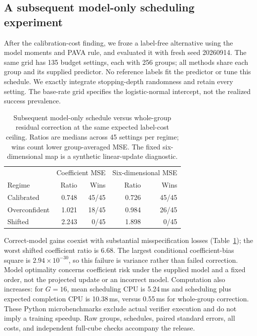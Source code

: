 \subsection{A subsequent model-only scheduling experiment}
After the calibration-cost finding, we froze a label-free alternative using the model moments and PAVA rule, and evaluated it with fresh seed 20260914. The same grid has 135 budget settings, each with 256 groups; all methods share each group and its supplied predictor. No reference labels fit the predictor or tune this schedule. We exactly integrate stopping-depth randomness and retain every setting. The base-rate grid specifies the logistic-normal intercept, not the realized success prevalence.

\begin{table}[t]
\centering
\caption{Subsequent model-only schedule versus whole-group residual correction at the same expected label-cost ceiling. Ratios are medians across 45 settings per regime; wins count lower group-averaged MSE. The fixed six-dimensional map is a synthetic linear-update diagnostic.}
\label{tab:model-only}
\begin{tabular}{lrrrr}
\toprule
&\multicolumn{2}{c}{Coefficient MSE}&\multicolumn{2}{c}{Six-dimensional MSE}\\
Regime&Ratio&Wins&Ratio&Wins\\
\midrule
Calibrated&0.748&45/45&0.726&45/45\\
Overconfident&1.021&18/45&0.984&26/45\\
Shifted&2.243&0/45&1.898&0/45\\
\bottomrule
\end{tabular}
\end{table}

Correct-model gains coexist with substantial misspecification losses (Table~\ref{tab:model-only}); the worst shifted coefficient ratio is 6.68. The largest conditional coefficient-bias square is $2.94\times10^{-30}$, so this failure is variance rather than failed correction. Model optimality concerns coefficient risk under the supplied model and a fixed order, not the projected update or an incorrect model. Computation also increases: for $G=16$, mean scheduling CPU is 5.24\,ms and scheduling plus expected completion CPU is 10.38\,ms, versus 0.55\,ms for whole-group correction. These Python microbenchmarks exclude actual verifier execution and do not imply a training speedup. Raw groups, schedules, paired standard errors, all costs, and independent full-cube checks accompany the release.
